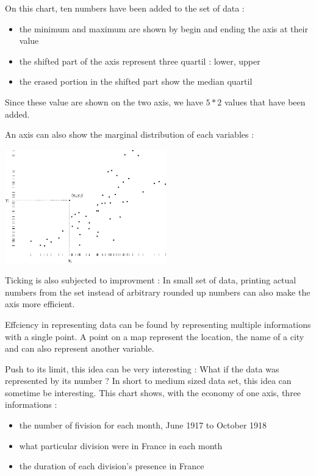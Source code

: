 On this chart, ten numbers have been added to the set of data : 
\begin{itemize}
\item the minimum and maximum are shown by begin and ending the axis at their value
\item the shifted part of the axis represent three quartil : lower, upper
\item the erased portion in the shifted part show the median quartil
\end{itemize}
Since these value are shown on the two axis, we have $5*2$ values that have been added.

An axis can also show the marginal distribution of each variables :

\centerline{
\includegraphics[width=07cm]{./illustrations/annexes/axesdistributions.eps}
}

Ticking is also subjected to improvment : In small set of data, printing actual numbers from the set instead of arbitrary rounded up numbers can also make the axis more efficient.

Effciency in representing data can be found by representing multiple informations with a single point. A point on a map represent the location, the name of a city and can also represent another variable.

 Push to its limit, this idea can be very interesting : What if the data was represented by its number ? In short to medium sized data set, this idea can sometime be interesting.
 This chart shows, with the economy of one axis, three informations : 

\begin{itemize}
\item the number of fivision for each month, June 1917 to October 1918
\item what particular division were in France in each month
\item the duration of each division's presence in France
\end{itemize}

